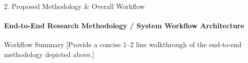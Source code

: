 \documentclass[aspectratio=169, 11pt]{beamer}
\begin{document}
\begin{frame}{2. Proposed Methodology \& Overall Workflow}
    \framesubtitle{End-to-End Research Methodology / System Workflow Architecture}
    \centering
    \vspace{0.2cm}

    \begin{block}{Workflow Summary}
        \footnotesize {[Provide a concise 1--2 line walkthrough of the end-to-end methodology depicted above.]}
    \end{block}
\end{frame}
\end{document}
